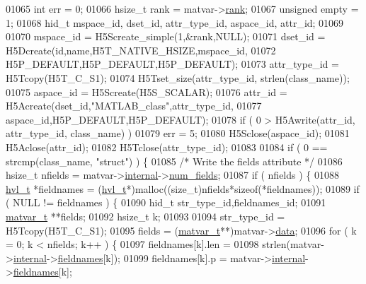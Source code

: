 \begin{DoxyCode}
01065     \textcolor{keywordtype}{int}      err = 0;
01066     hsize\_t  rank = matvar->\hyperlink{group___m_a_t_a84ba70c96ded13cc555fa75b768d9921}{rank};
01067     \textcolor{keywordtype}{unsigned} empty = 1;
01068     hid\_t    mspace\_id, dset\_id, attr\_type\_id, aspace\_id, attr\_id;
01069 
01070     mspace\_id = H5Screate\_simple(1,&rank,NULL);
01071     dset\_id = H5Dcreate(\textcolor{keywordtype}{id},name,H5T\_NATIVE\_HSIZE,mspace\_id,
01072                         H5P\_DEFAULT,H5P\_DEFAULT,H5P\_DEFAULT);
01073     attr\_type\_id = H5Tcopy(H5T\_C\_S1);
01074     H5Tset\_size(attr\_type\_id, strlen(class\_name));
01075     aspace\_id = H5Screate(H5S\_SCALAR);
01076     attr\_id = H5Acreate(dset\_id,\textcolor{stringliteral}{"MATLAB\_class"},attr\_type\_id,
01077                         aspace\_id,H5P\_DEFAULT,H5P\_DEFAULT);
01078     \textcolor{keywordflow}{if} ( 0 > H5Awrite(attr\_id, attr\_type\_id, class\_name) )
01079         err = 5;
01080     H5Sclose(aspace\_id);
01081     H5Aclose(attr\_id);
01082     H5Tclose(attr\_type\_id);
01083 
01084     \textcolor{keywordflow}{if} ( 0 == strcmp(class\_name, \textcolor{stringliteral}{"struct"}) ) \{
01085         \textcolor{comment}{/* Write the fields attribute */}
01086         hsize\_t nfields = matvar->\hyperlink{group___m_a_t_a6e97e3ed9f40c49322c18561c2a94e92}{internal}->\hyperlink{structmatvar__internal_a93fc447484f455eddf9334f2e9e411c2}{num\_fields};
01087         \textcolor{keywordflow}{if} ( nfields ) \{
01088             \hyperlink{structhvl__t}{hvl\_t} *fieldnames = (\hyperlink{structhvl__t}{hvl\_t}*)malloc((\textcolor{keywordtype}{size\_t})nfields*\textcolor{keyword}{sizeof}(*fieldnames));
01089             \textcolor{keywordflow}{if} ( NULL != fieldnames ) \{
01090                 hid\_t      str\_type\_id,fieldnames\_id;
01091                 \hyperlink{group___m_a_t_structmatvar__t}{matvar\_t} **fields;
01092                 hsize\_t    k;
01093 
01094                 str\_type\_id = H5Tcopy(H5T\_C\_S1);
01095                 fields     = (\hyperlink{group___m_a_t_structmatvar__t}{matvar\_t}**)matvar->\hyperlink{group___m_a_t_a5672978efa230bbdecdf38ede781f7fa}{data};
01096                 for ( k = 0; k < nfields; k++ ) \{
01097                     fieldnames[k].len =
01098                     strlen(matvar->\hyperlink{group___m_a_t_a6e97e3ed9f40c49322c18561c2a94e92}{internal}->\hyperlink{structmatvar__internal_a7574d000bfc98ad4860ae6590b8d4985}{fieldnames}[k]);
01099                     fieldnames[k].p   = matvar->\hyperlink{group___m_a_t_a6e97e3ed9f40c49322c18561c2a94e92}{internal}->\hyperlink{structmatvar__internal_a7574d000bfc98ad4860ae6590b8d4985}{fieldnames}[k];

\end{DoxyCode}
